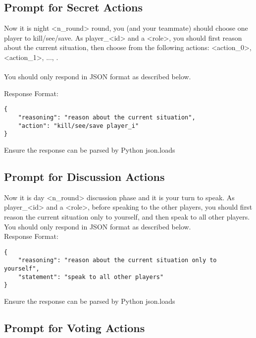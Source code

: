 \subsection{Prompt for Secret Actions}

\begin{tcolorbox}
{\ttfamily\small

Now it is night <n\_round> round, you (and your teammate) should choose one player to kill/see/save.
As player\_<id> and a <role>, you should first reason about the current situation, then choose from the following actions: <action\_0>, <action\_1>, ..., .\\
\\
You should only respond in JSON format as described below.
}
\end{tcolorbox}
\begin{tcolorbox}
{\ttfamily\small
Response Format: \\
\begin{verbatim}
{
    "reasoning": "reason about the current situation",
    "action": "kill/see/save player_i"
}
\end{verbatim}
Ensure the response can be parsed by Python json.loads
}
\end{tcolorbox}

\subsection{Prompt for Discussion Actions}

\begin{tcolorbox}

{\ttfamily\small
Now it is day <n\_round> discussion phase and it is your turn to speak.
As player\_<id> and a <role>, before speaking to the other players, you should first reason the current situation only to yourself, and then speak to all other players.
You should only respond in JSON format as described below.
\\
Response Format:
\begin{verbatim}
{
    "reasoning": "reason about the current situation only to yourself",
    "statement": "speak to all other players"
}
\end{verbatim}
Ensure the response can be parsed by Python json.loads
}
\end{tcolorbox}

\subsection{Prompt for Voting Actions}

